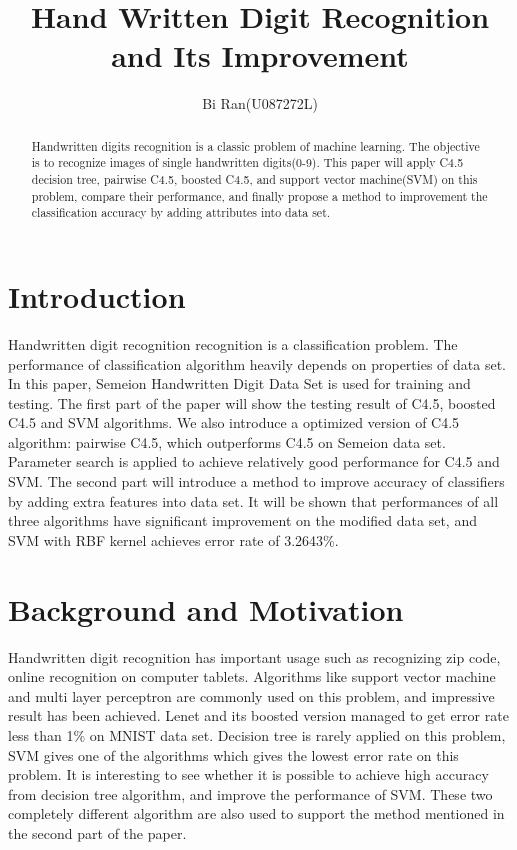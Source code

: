 \documentclass[a4paper,11pt]{article}
\author{Bi Ran(U087272L)}
\title{Hand Written Digit Recognition and Its Improvement}
\begin{document}
\maketitle
\begin{abstract}
Handwritten digits recognition is a classic problem of machine learning. The objective is to recognize images of single handwritten digits(0-9). This paper will apply C4.5 decision tree, pairwise C4.5, boosted C4.5, and support vector machine(SVM) on this problem, compare their performance, and finally propose a method to improvement the classification accuracy by adding attributes into data set.
\end{abstract}
\section{Introduction}
Handwritten digit recognition recognition is a classification problem. The performance of classification algorithm heavily depends on properties of data set.
In this paper, Semeion Handwritten Digit Data Set is used for training and testing. The first part of the paper will show the testing result of C4.5, boosted C4.5 and SVM algorithms. We also introduce a optimized version of C4.5 algorithm: pairwise C4.5, which outperforms C4.5 on Semeion data set. Parameter search is applied to achieve relatively good performance for C4.5 and SVM.
The second part will introduce a method to improve accuracy of classifiers by adding extra features into data set. It will be shown that performances of all three algorithms have significant improvement on the modified data set, and SVM with RBF kernel achieves error rate of 3.2643\%.
\section{Background and Motivation}
Handwritten digit recognition has important usage such as recognizing zip code, online recognition on computer tablets. Algorithms like support vector machine and multi layer perceptron are commonly used on this problem, and impressive result has been achieved. Lenet and its boosted version managed to get error rate less than 1\% on MNIST data set\cite{Kussul_improvedmethod}. Decision tree is rarely applied on this problem, SVM gives one of the algorithms which gives the lowest error rate on this problem. It is interesting to see whether it is possible to achieve high accuracy from decision tree algorithm, and improve the performance of SVM. These two completely different algorithm are also used to support the method mentioned in the second part of the paper.
\end{document}
